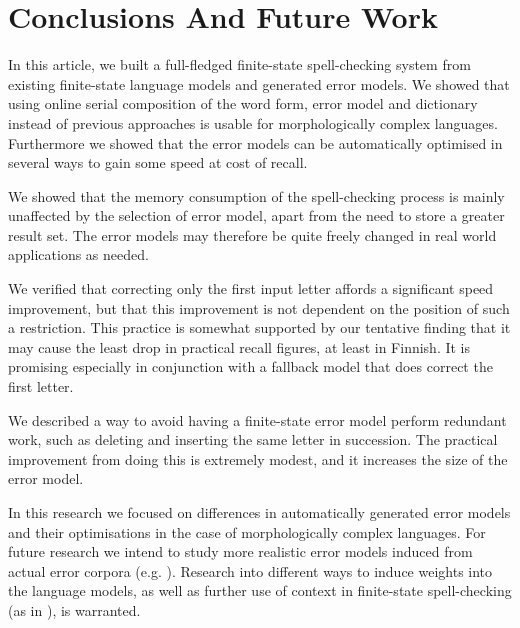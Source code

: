 \documentclass[11pt]{article}
\begin{document}
\section{Conclusions And Future Work}
\label{sec:conclusions}

In this article, we built a full-fledged finite-state spell-checking system from
existing finite-state language models and generated error models. We showed
that using online serial composition of the word form, error model and
dictionary instead of previous approaches is usable for morphologically
complex languages. Furthermore
we showed that the error models can be automatically optimised in several ways
to gain some speed at cost of recall.

We showed that the memory consumption of the spell-checking process is mainly
unaffected by the selection of error model, apart from the need to store
a greater result set. The error models may therefore be quite freely changed
in real world applications as needed.

We verified that correcting only the first input letter affords a significant
speed improvement, but that this improvement is not dependent on the position
of such a restriction. This practice is somewhat supported by our tentative
finding that it may cause the least drop in practical recall figures, at least
in Finnish. It is promising especially in conjunction with a fallback model
that does correct the first letter.

We described a way to avoid having a finite-state error model perform
redundant work, such as deleting and inserting the same letter in succession.
The practical improvement from doing this is extremely modest, and it increases
the size of the error model.

In this research we focused on differences in automatically generated error
models and their optimisations in the case of morphologically complex languages.
For future research we intend to study more realistic error models induced from
actual error corpora (e.g. ). Research into
different ways to induce weights into the language models, as well as further use
of context in finite-state spell-checking (as in
), is warranted.





\end{document}
